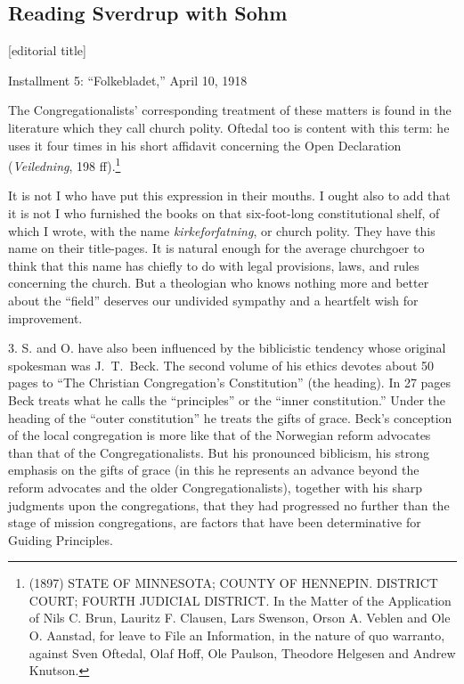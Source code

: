 
\subsection{Reading Sverdrup with Sohm}

[editorial title]

Installment 5: ``Folkebladet,'' April 10, 1918

The Congregationalists' corresponding treatment of these matters is found in the literature which they call church polity. Oftedal too is content with this term: he uses it four times in his short affidavit concerning the Open Declaration (\textit{Veiledning}, 198 ff).\footnote{(1897) STATE OF MINNESOTA; COUNTY OF HENNEPIN. DISTRICT COURT; FOURTH JUDICIAL DISTRICT. In the Matter of the Application of Nils C. Brun, Lauritz F. Clausen, Lars Swenson, Orson A. Veblen and Ole O. Aanstad, for leave to File an Information, in the nature of quo warranto, against Sven Oftedal, Olaf Hoff, Ole Paulson, Theodore Helgesen and Andrew Knutson.}

It is not I who have put this expression in their mouths. I ought also to add that it is not I who furnished the books on that six-foot-long constitutional shelf, of which I wrote, with the name \textit{kirkeforfatning}, or church polity. They have this name on their title-pages. It is natural enough for the average churchgoer to think that this name has chiefly to do with legal provisions, laws, and rules concerning the church. But a theologian who knows nothing more and better about the ``field'' deserves our undivided sympathy and a heartfelt wish for improvement.

3. S. and O. have also been influenced by the biblicistic tendency whose original spokesman was J.~T.~Beck. The second volume of his ethics devotes about 50 pages to ``The Christian Congregation’s Constitution'' (the heading). In 27 pages Beck treats what he calls the ``principles'' or the ``inner constitution.'' Under the heading of the ``outer constitution'' he treats the gifts of grace. Beck's conception of the local congregation is more like that of the Norwegian reform advocates than that of the Congregationalists. But his pronounced biblicism, his strong emphasis on the gifts of grace (in this he represents an advance beyond the reform advocates and the older Congregationalists), together with his sharp judgments upon the congregations, that they had progressed no further than the stage of mission congregations, are factors that have been determinative for Guiding Principles.

